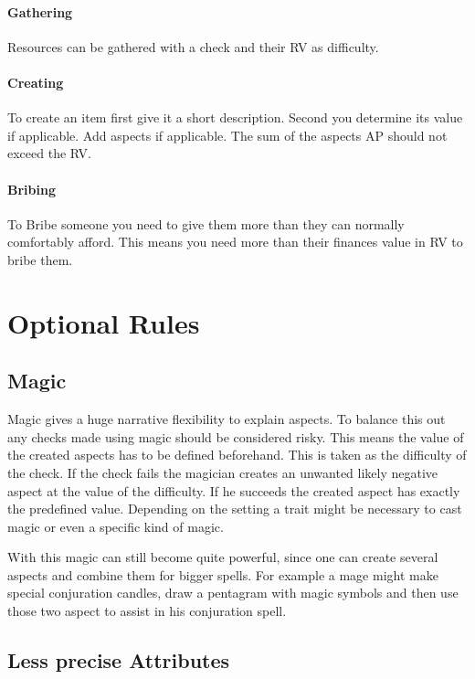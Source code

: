 \documentclass[11pt]{article}
\begin{document}
{\paragraph*{Gathering}
\label{sec:org21b6a71}
Resources can be gathered with a check and their RV as difficulty.

\paragraph*{Creating}
\label{sec:orgfc596f3}
To create an item first give it a short description. Second you determine its value if applicable. Add aspects if applicable. The sum of the aspects AP should not exceed the RV.

\paragraph*{Bribing}
\label{sec:org51b8cb0}
To Bribe someone you need to give them more than they can normally comfortably afford. This means you need more than their finances value in RV to bribe them.

\section{Optional Rules}
\label{sec:org8892695}
\subsection{Magic}
\label{sec:orgf778329}

Magic gives a huge narrative flexibility to explain aspects. To balance this out any checks made using magic should be considered risky. This means the value of the created aspects has to be defined beforehand. This is taken as the difficulty of the check. If the check fails the magician creates an unwanted likely negative aspect at the value of the difficulty. If he succeeds the created aspect has exactly the predefined value. Depending on the setting a trait might be necessary to cast magic or even a specific kind of magic.

With this magic can still become quite powerful, since one can create several aspects and combine them for bigger spells. For example a mage might make special conjuration candles, draw a pentagram with magic symbols and then use those two aspect to assist in his conjuration spell.

\subsection{Less precise Attributes}
\label{sec:org9768f64}

}
\end{document}
